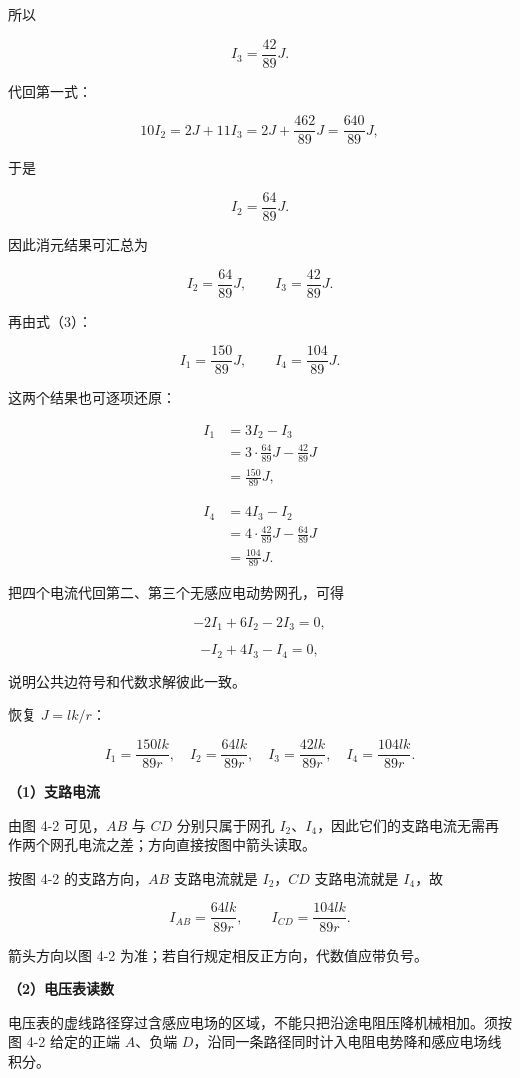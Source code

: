 \documentclass[12pt,a4paper,UTF8]{ctexart}
\begin{document}
所以

\[I_3=\frac{42}{89}J.\]

代回第一式：

\[10I_2=2J+11I_3
=2J+\frac{462}{89}J
=\frac{640}{89}J,\]

于是

\[I_2=\frac{64}{89}J.\]

因此消元结果可汇总为

\[I_2=\frac{64}{89}J,\qquad I_3=\frac{42}{89}J. \tag{6}\]

再由式（3）：

\[I_1=\frac{150}{89}J,\qquad I_4=\frac{104}{89}J. \tag{7}\]

这两个结果也可逐项还原：

\[\begin{aligned}
I_1
&=3I_2-I_3\\
&=3\cdot\frac{64}{89}J-\frac{42}{89}J\\
&=\frac{150}{89}J,
\end{aligned}\]

\[\begin{aligned}
I_4
&=4I_3-I_2\\
&=4\cdot\frac{42}{89}J-\frac{64}{89}J\\
&=\frac{104}{89}J.
\end{aligned}\]

把四个电流代回第二、第三个无感应电动势网孔，可得

\[-2I_1+6I_2-2I_3=0,\]

\[-I_2+4I_3-I_4=0,\]

说明公共边符号和代数求解彼此一致。

恢复 \(J=lk/r\)：

\[\boxed{
I_1=\frac{150lk}{89r},\quad
I_2=\frac{64lk}{89r},\quad
I_3=\frac{42lk}{89r},\quad
I_4=\frac{104lk}{89r}
}. \tag{8}\]

\textbf{（1）支路电流}

由图 4-2 可见，\(AB\) 与 \(CD\) 分别只属于网孔
\(I_2\)、\(I_4\)，因此它们的支路电流无需再作两个网孔电流之差；方向直接按图中箭头读取。

按图 4-2 的支路方向，\(AB\) 支路电流就是 \(I_2\)，\(CD\) 支路电流就是
\(I_4\)，故

\[\boxed{I_{AB}=\frac{64lk}{89r}},\qquad
\boxed{I_{CD}=\frac{104lk}{89r}}. \tag{9}\]

箭头方向以图 4-2 为准；若自行规定相反正方向，代数值应带负号。

\textbf{（2）电压表读数}

电压表的虚线路径穿过含感应电场的区域，不能只把沿途电阻压降机械相加。须按图
4-2 给定的正端 \(A\)、负端
\(D\)，沿同一条路径同时计入电阻电势降和感应电场线积分。
\end{document}
